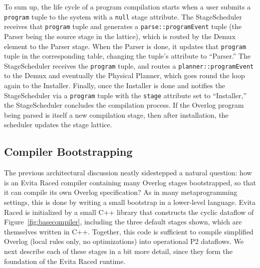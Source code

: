 \documentclass{sigmod08}
\newcommand{\ol}[1]{\texttt{\small #1}\xspace}
\begin{document}
To sum up, the life cycle of a program compilation starts when a user
submits a \ol{program} tuple to the system with a \ol{null} stage
attribute. The StageScheduler receives that \ol{program} tuple and
generates a
\ol{parse::programEvent} tuple (the Parser being the source stage in the
lattice), which is routed by the Demux element to
the Parser stage. When the Parser is done, it updates that \ol{program} tuple
in the corresponding table, changing the tuple's attribute to
``Parser.''  The StageScheduler receives the \ol{program} tuple, and routes a
\ol{planner::programEvent} to the Demux and eventually the Physical Planner, which goes round the loop again to the
Installer.  Finally, once the Installer is done and notifies the
StageScheduler via a \ol{program} tuple with the \ol{stage} attribute set to
``Installer,'' the StageScheduler concludes the compilation process.
If the Overlog program being parsed is itself a new compilation stage, then after
installation, the scheduler updates the stage lattice.


\subsection{Compiler Bootstrapping}
\label{sec:bootstrap}
The previous architectural discussion neatly sidestepped a natural question: how is an Evita Raced compiler containing many Overlog stages bootstrapped, so that it can compile its own Overlog specification?
As in many metaprogramming settings, this is done by writing a small bootstrap  in a lower-level language. Evita Raced is initialized by a small C++ library that constructs the cyclic dataflow of Figure~\ref{fig:basecompiler}, including the three default stages shown, which are themselves written in C++. %
Together, this code is sufficient
to compile simplified Overlog (local rules only, no optimizations) into
operational P2 dataflows. We next describe each of these stages in a bit
more detail, since they form the foundation of the Evita Raced runtime.


\end{document}
